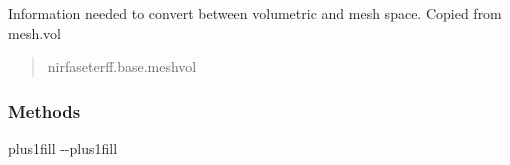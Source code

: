 \documentclass[letterpaper,10pt,english]{sphinxmanual}
\begin{document}
\begin{fulllineitems}
\begin{fulllineitems}
\begin{quote}
\begin{description}
\end{description}\end{quote}

\end{fulllineitems}


\begin{fulllineitems}
\label{\detokenize{_autosummary/nirfasterff.base.data.FDdata:nirfasterff.base.data.FDdata.vol}}
\pysigstartsignatures
\pysigline
{}
\pysigstopsignatures
\sphinxAtStartPar
Information needed to convert between volumetric and mesh space. Copied from mesh.vol
\begin{quote}\begin{description}
\sphinxAtStartPar
nirfaseterff.base.meshvol

\end{description}\end{quote}

\end{fulllineitems}


\begin{fulllineitems}
\label{\detokenize{_autosummary/nirfasterff.base.data.FDdata:nirfasterff.base.data.FDdata.__init__}}
\pysigstartsignatures
\pysiglinewithargsret
{}
{}
{}
\pysigstopsignatures
\end{fulllineitems}

\subsubsection*{Methods}


\begin{savenotes}
\sphinxatlongtablestart
\sphinxthistablewithglobalstyle
\sphinxthistablewithnovlinesstyle
\makeatletter
  \LTleft \@totalleftmargin plus1fill
  \LTright\dimexpr\columnwidth-\@totalleftmargin-\linewidth\relax plus1fill
\makeatother
\begin{longtable}{}
\sphinxtoprule
\endfirsthead

\\
\sphinxtoprule
\endhead


\end{longtable}
\end{savenotes}
\end{fulllineitems}
\end{document}
